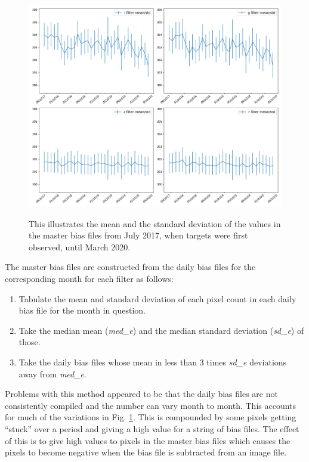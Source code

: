 \begin{figure}[!htbp]
\begin{center}
\includegraphics[scale=0.4]{images/mastmeanbias.png}
\end{center}   
\caption{This illustrates the mean and the standard deviation of the values in
the master bias files from July 2017, when {\rdwarf} targets were first
observed, until March 2020.}
\protect\label{fig:mastmeanbias}
\end{figure}
\clearpage

The master bias files are constructed from the daily bias files for the
corresponding month for each filter as follows:

\begin{enumerate}
  \item Tabulate the mean and standard deviation of each pixel count in each
  daily bias file for the month in question.
  \item Take the median mean (\textit{med\_e}) and the median standard deviation
  (\textit{sd\_e}) of those.
  \item Take the daily bias files whose mean in less than 3 times \textit{sd\_e}
  deviations away from \textit{med\_e}.
\end{enumerate}

Problems with this method appeared to be that the daily bias files are not
consistently compiled and the number can vary month to month. This accounts for
much of the variations in Fig. \ref{fig:mastmeanbias}. This is compounded by
some pixels getting ``stuck'' over a period and giving a high value for a string
of bias files. The effect of this is to give high values to pixels in the master
bias files which causes the pixels to become negative when the bias file is
subtracted from an image file.

